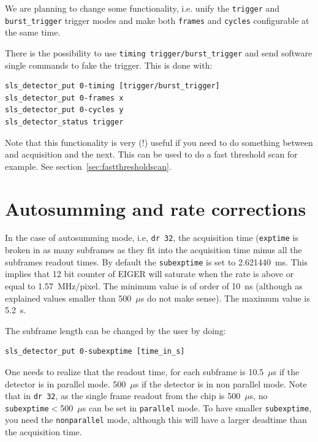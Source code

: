 \documentclass{article}
\newcommand{\E}{EIGER\xspace}
\begin{document}
We are planning to change some functionality, i.e. unify the {\tt{trigger}} and {\tt{burst\_trigger}} trigger modes and make both {\tt{frames}} and {\tt{cycles}} configurable at the same time.

There is the possibility to use {\tt{timing trigger/burst\_trigger}} and send software single commands to fake the trigger. This is done with:
\begin{verbatim}
sls_detector_put 0-timing [trigger/burst_trigger]
sls_detector_put 0-frames x
sls_detector_put 0-cycles y
sls_detector_status trigger
\end{verbatim}
 Note that this functionality is very (!) useful if you need to do something between and acquisition and the next. This can be used to do a fast threshold scan for example. See section~\ref{sec:fastthresholdscan}.


\section{Autosumming and rate corrections} \label{advanced}

In the case of autosumming mode, i.e, {\tt{dr 32}}, the acquisition time ({\tt{exptime}} is broken in as many subframes as they fit into the acquisition time minus all the subframes readout times. By default the {\tt{subexptime}} is set to 2.621440~ms. This implies that 12 bit counter of \E will saturate when the rate is above or equal to 1.57~MHz/pixel. The minimum value is of order of 10~ns (although as explained values smaller than 500~$\mu$s do not make sense). The maximum value is 5.2~s.

The subframe length can be changed by the user by doing: 
\begin{verbatim}
sls_detector_put 0-subexptime [time_in_s] 
\end{verbatim}

One needs to realize that the readout time, for each subframe is 10.5~$\mu$s if the detector is in parallel mode. 500~$\mu$s if the detector is in non parallel mode. Note that in {\tt{dr 32}}, as the single frame readout from the chip is 500~$\mu$s, no {\tt{subexptime}}$<$500~$\mu$s can be set in {\tt{parallel}} mode. To have smaller {\tt{subexptime}}, you need the {\tt{nonparallel}} mode, although this will have a larger deadtime than the acquisition time.\\
\end{document}
